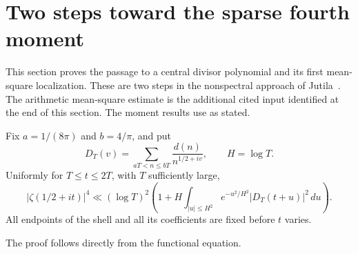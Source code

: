 \section{Two steps toward the sparse fourth moment}
\label{app:iwanieclocal}

This section proves the passage to a central divisor polynomial and
its first mean-square localization. These are two steps in the
nonspectral approach of Jutila~\cite{Jut91}. The arithmetic mean-square
estimate is the additional cited input identified at the end of this
section. The moment results use \cite[(\ref*{six-eq:basefourth})]{Weighted} as stated.

\begin{proposition}
\label{prop:centralshell}
Fix $a=1/(8\pi)$ and $b=4/\pi$, and put
\[
 D_T(v)=\sum_{aT<n\le bT}\frac{d(n)}{n^{1/2+iv}},\qquad H=\log T.
\]
Uniformly for $T\le t\le2T$, with $T$ sufficiently large,
\begin{equation}\label{eq:centralshell}
 |\zeta(1/2+it)|^4
 \ll (\log T)^2\left(1+H\int_{|u|\le H^2}
                    e^{-u^2/H^2}|D_T(t+u)|^2\,du\right).
\end{equation}
All endpoints of the shell and all its coefficients are fixed before
$t$ varies.
\end{proposition}
The proof follows directly from the functional equation.

